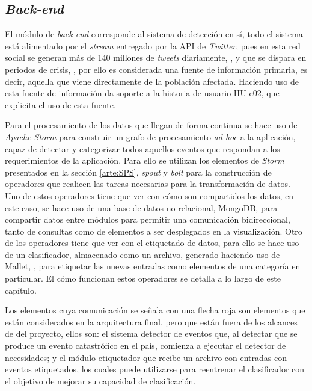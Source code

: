 \subsection{\textit{Back-end}}
\label{subsec:backend}

El módulo de \textit{back-end} corresponde al sistema de detección en sí, todo el sistema está alimentado por el \textit{stream} entregado por la API de \textit{Twitter}, pues en esta red social se generan más de 140 millones de \textit{tweets} diariamente, \cite{StormIBM}, y que se dispara en periodos de crisis, \cite{TaxonomiaChato}, por ello es considerada una fuente de información primaria, es decir, aquella que viene directamente de la población afectada. Haciendo uso de esta fuente de información da soporte a la historia de usuario HU-c02, que explicita el uso de esta fuente.

Para el procesamiento de los datos que llegan de forma continua se hace uso de \textit{Apache Storm} para construir un grafo de procesamiento \textit{ad-hoc} a la aplicación, capaz de detectar y categorizar todos aquellos eventos que respondan a los requerimientos de la aplicación. Para ello se utilizan los elementos de \textit{Storm} presentados en la sección \ref{arte:SPS}, \textit{spout} y \textit{bolt} para la construcción de operadores que realicen las tareas necesarias para la transformación de datos. Uno de estos operadores tiene que ver con cómo son compartidos los datos, en este caso, se hace uso de una base de datos no relacional, MongoDB, para compartir datos entre módulos para permitir una comunicación bidireccional, tanto de consultas como de elementos a ser desplegados en la visualización. Otro de los operadores tiene que ver con el etiquetado de datos, para ello se hace uso de un clasificador, almacenado como un archivo, generado haciendo uso de Mallet, \cite{Mallet}, para etiquetar las nuevas entradas como elementos de una categoría en particular. El cómo funcionan estos operadores se detalla a lo largo de este capítulo.

Los elementos cuya comunicación se señala con una flecha roja son elementos que están considerados en la arquitectura final, pero que están fuera de los alcances de del proyecto, ellos son: el sistema detector de eventos que, al detectar que se produce un evento catastrófico en el país, comienza a ejecutar el detector de necesidades; y el módulo etiquetador que recibe un archivo con entradas con eventos etiquetados, los cuales puede utilizarse para reentrenar el clasificador con el objetivo de mejorar su capacidad de clasificación.

